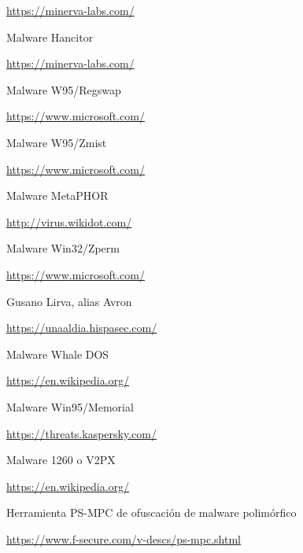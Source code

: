 \documentclass[15pt]{article}
\begin{document}
\begin{thebibliography}{40}
		\href{https://minerva-labs.com/blog/redline-stealer-masquerades-as-telegram-installer/}{https://minerva-labs.com/}
		
		Malware Hancitor
		
		\href{https://minerva-labs.com/blog/hancitor-malware/}{https://minerva-labs.com/}
		
		Malware W95/Regswap
		
		\href{https://www.microsoft.com/en-us/wdsi/threats/malware-encyclopedia-description?Name=Virus:Win95/Regswap.1644.dr&threatId=-2147420803}{https://www.microsoft.com/}
		
		
		Malware W95/Zmist
		
		\href{https://www.microsoft.com/en-us/wdsi/threats/malware-encyclopedia-description?Name=Virus%3AWin95%2FZmist.A&ThreatID=-21474218163}{https://www.microsoft.com/}
		
		Malware MetaPHOR
		
		\href{http://virus.wikidot.com/metaphor}{http://virus.wikidot.com/}
		
		Malware Win32/Zperm
		
		\href{https://www.microsoft.com/en-us/wdsi/threats/malware-encyclopedia-description?Name=Virus:Win32/Zperm.A}{https://www.microsoft.com/}
		
		Gusano Lirva, alias Avron
		
		\href{https://unaaldia.hispasec.com/2003/01/versiones-del-gusano-lirva-alias-avril-avron-naith.html}{https://unaaldia.hispasec.com/}
		
		Malware Whale DOS
		
		\href{https://en.wikipedia.org/wiki/Whale_(computer_virus)}{https://en.wikipedia.org/}
		
		Malware Win95/Memorial
		
		\href{https://threats.kaspersky.com/mx/threat/Virus.Win9x.Memorial/}{https://threats.kaspersky.com/}
		
		Malware 1260 o V2PX
		
		\href{https://en.wikipedia.org/wiki/1260_(computer_virus)}{https://en.wikipedia.org/}
		
		Herramienta PS-MPC de ofuscación de malware polimórfico
		
		\href{https://www.f-secure.com/v-descs/ps-mpc.shtml}{https://www.f-secure.com/v-descs/ps-mpc.shtml}
		

\end{thebibliography}
\end{document}
